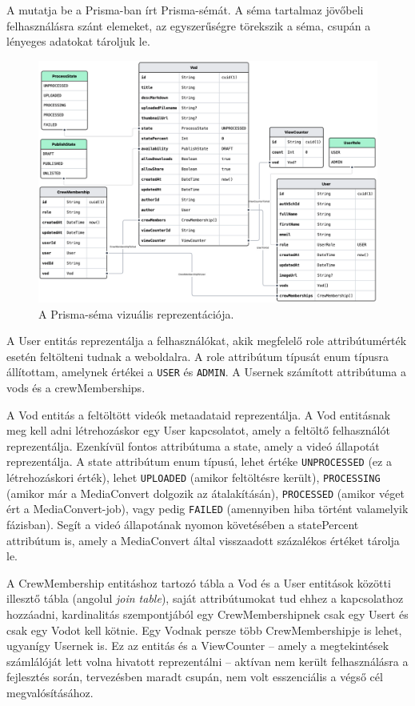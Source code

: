 A  mutatja be a Prisma-ban írt Prisma-sémát. A séma tartalmaz jövőbeli felhasználásra szánt elemeket, az egyszerűségre törekszik a séma, csupán a lényeges adatokat tároljuk le.

\begin{figure}[!ht]
  \centering
  \includegraphics[width=155mm, keepaspectratio]{figures/prismaliser.png}
  \caption{A Prisma-séma vizuális reprezentációja.}
  \label{fig:prismaliser}
\end{figure}

A User entitás reprezentálja a felhasználókat, akik megfelelő role attribútumérték esetén feltölteni tudnak a weboldalra. A role attribútum típusát enum típusra állítottam, amelynek értékei a \verb|USER| és \verb|ADMIN|. A Usernek számított attribútuma a vods és a crewMemberships.

A Vod entitás a feltöltött videók metaadataid reprezentálja. A Vod entitásnak meg kell adni létrehozáskor egy User kapcsolatot, amely a feltöltő felhasználót reprezentálja. Ezenkívül fontos attribútuma a state, amely a videó állapotát reprezentálja. A state attribútum enum típusú, lehet értéke \verb|UNPROCESSED| (ez a létrehozáskori érték), lehet \verb|UPLOADED| (amikor feltöltésre került), \verb|PROCESSING| (amikor már a MediaConvert dolgozik az átalakításán), \verb|PROCESSED| (amikor véget ért a MediaConvert-job), vagy pedig \verb|FAILED| (amennyiben hiba történt valamelyik fázisban). Segít a videó állapotának nyomon követésében a statePercent attribútum is, amely a MediaConvert által visszaadott százalékos értéket tárolja le.

A CrewMembership entitáshoz tartozó tábla a Vod és a User entitások közötti illesztő tábla (angolul \emph{join table}), saját attribútumokat tud ehhez a kapcsolathoz hozzáadni, kardinalitás szempontjából egy CrewMembershipnek csak egy Usert és csak egy Vodot kell kötnie. Egy Vodnak persze több CrewMembershipje is lehet, ugyanígy Usernek is. Ez az entitás és a ViewCounter -- amely a megtekintések számlálóját lett volna hivatott reprezentálni -- aktívan nem került felhasználásra a fejlesztés során, tervezésben maradt csupán, nem volt esszenciális a végső cél megvalósításához.

